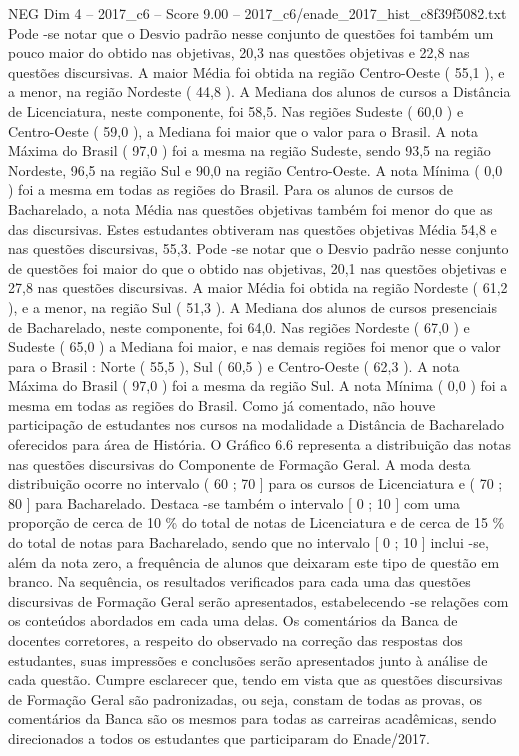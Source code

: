 \begin{textsample}{NEG Dim 4 – 2017\_c6 – Score 9.00 – 2017\_c6/enade\_2017\_hist\_c8f39f5082.txt}
Pode -se notar que o Desvio padrão nesse conjunto de questões foi também um pouco maior do obtido nas objetivas, 20,3 nas questões objetivas e 22,8 nas questões discursivas.
A maior Média foi obtida na região Centro-Oeste ( 55,1 ), e a menor, na região Nordeste ( 44,8 ).
A Mediana dos alunos de cursos a Distância de Licenciatura, neste componente, foi 58,5.
Nas regiões Sudeste ( 60,0 ) e Centro-Oeste ( 59,0 ), a Mediana foi maior que o valor para o Brasil.
A nota Máxima do Brasil ( 97,0 ) foi a mesma na região Sudeste, sendo 93,5 na região Nordeste, 96,5 na região Sul e 90,0 na região Centro-Oeste.
A nota Mínima ( 0,0 ) foi a mesma em todas as regiões do Brasil.
Para os alunos de cursos de Bacharelado, a nota Média nas questões objetivas também foi menor do que as das discursivas.
Estes estudantes obtiveram nas questões objetivas Média 54,8 e nas questões discursivas, 55,3.
Pode -se notar que o Desvio padrão nesse conjunto de questões foi maior do que o obtido nas objetivas, 20,1 nas questões objetivas e 27,8 nas questões discursivas.
A maior Média foi obtida na região Nordeste ( 61,2 ), e a menor, na região Sul ( 51,3 ).
A Mediana dos alunos de cursos presenciais de Bacharelado, neste componente, foi 64,0.
Nas regiões Nordeste ( 67,0 ) e Sudeste ( 65,0 ) a Mediana foi maior, e nas demais regiões foi menor que o valor para o Brasil : Norte ( 55,5 ), Sul ( 60,5 ) e Centro-Oeste ( 62,3 ).
A nota Máxima do Brasil ( 97,0 ) foi a mesma da região Sul.
A nota Mínima ( 0,0 ) foi a mesma em todas as regiões do Brasil.
Como já comentado, não houve participação de estudantes nos cursos na modalidade a Distância de Bacharelado oferecidos para área de História.
O Gráfico 6.6 representa a distribuição das notas nas questões discursivas do Componente de Formação Geral.
A moda desta distribuição ocorre no intervalo ( 60 ; 70 ] para os cursos de Licenciatura e ( 70 ; 80 ] para Bacharelado.
Destaca -se também o intervalo [ 0 ; 10 ] com uma proporção de cerca de 10 \% do total de notas de Licenciatura e de cerca de 15 \% do total de notas para Bacharelado, sendo que no intervalo [ 0 ; 10 ] inclui -se, além da nota zero, a frequência de alunos que deixaram este tipo de questão em branco.
Na sequência, os resultados verificados para cada uma das questões discursivas de Formação Geral serão apresentados, estabelecendo -se relações com os conteúdos abordados em cada uma delas.
Os comentários da Banca de docentes corretores, a respeito do observado na correção das respostas dos estudantes, suas impressões e conclusões serão apresentados junto à análise de cada questão.
Cumpre esclarecer que, tendo em vista que as questões discursivas de Formação Geral são padronizadas, ou seja, constam de todas as provas, os comentários da Banca são os mesmos para todas as carreiras acadêmicas, sendo direcionados a todos os estudantes que participaram do Enade/2017.

\end{textsample}
